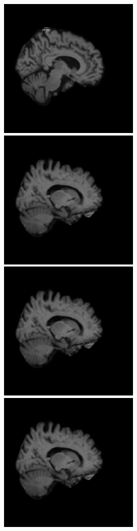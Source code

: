 \documentclass[12pt, fleqn, titlepage]{article}
\newcommand\skipper{1.4pt}
\newcommand\ripper{2.5pt}
\begin{document}
\begin{figure}[H]
\begin{subfigure}[b]{0.7\textwidth}
	\end{subfigure}
	\vskip\ripper
	\begin{subfigure}[b]{0.7\textwidth}
		\centering
		\includegraphics[width=0.22\linewidth]{imgs/1.5T_no_noise}
		\hskip\skipper
		\includegraphics[width=0.22\linewidth]{imgs/3T_no_noise}
		\hskip\skipper
		\includegraphics[width=0.22\linewidth]{imgs/3T_no_noise}
		\hskip\skipper
		\includegraphics[width=0.22\linewidth]{imgs/3T_no_noise}
	\end{subfigure}
\end{figure}
\end{document}
